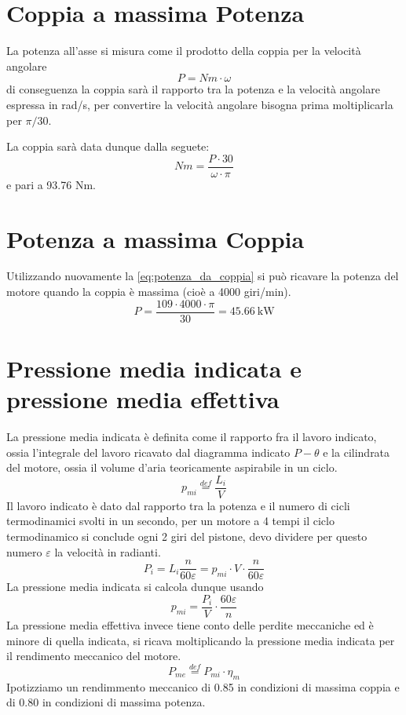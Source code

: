 \documentclass[a4paper,12pt]{article}
\begin{document}
\section{Coppia a massima Potenza}
\label{sec:coppia_a_massima_potenza}
La potenza all'asse si misura come il prodotto della coppia per la velocità angolare
\begin{equation}
    \label{eq:potenza_da_coppia}
    P = Nm \cdot \omega
\end{equation}
di conseguenza la coppia sarà il rapporto tra la potenza e la velocità angolare espressa in rad/s, per convertire la velocità angolare bisogna prima moltiplicarla
per $\pi/30$.

La coppia sarà data dunque dalla seguete:
\begin{equation}
    Nm = \frac{P\cdot 30 }{\omega\cdot \pi}
\end{equation}
e pari a 93.76 Nm.

\section{Potenza a massima Coppia}
Utilizzando nuovamente la \eqref{eq:potenza_da_coppia} si può ricavare la potenza del motore quando la coppia è massima (cioè a 4000 giri/min).
\begin{equation*}
    P = \frac{109\cdot4000\cdot\pi}{30} = 45.66\ \text{kW}
\end{equation*}

\section{Pressione media indicata e pressione media effettiva}
La pressione media indicata è definita come il rapporto fra il lavoro indicato, ossia l'integrale del lavoro ricavato dal diagramma indicato $P-\theta$ e la cilindrata
del motore, ossia il volume d'aria teoricamente aspirabile in un ciclo.
\begin{equation}
    p_{mi} \stackrel{def}{=} \frac{L_i}{V}
\end{equation}
Il lavoro indicato è dato dal rapporto tra la potenza e il numero di cicli termodinamici svolti in un secondo, per un motore a 4 tempi il ciclo termodinamico si conclude 
ogni 2 giri del pistone, devo dividere per questo numero $\varepsilon$ la velocità in radianti.
\begin{equation}
    P_i = L_i \frac{n}{60\varepsilon} = p_{mi} \cdot V \cdot \frac{n}{60\varepsilon}
\end{equation}
La pressione media indicata si calcola dunque usando
\begin{equation}
    \label{eq:pressione_media_indicata}
    p_{mi} = \frac{P_i}{V} \cdot  \frac{60\varepsilon}{n}
\end{equation}
La pressione media effettiva invece tiene conto delle perdite meccaniche ed è minore di quella indicata, si ricava moltiplicando la pressione media indicata
per il rendimento meccanico del motore.
\begin{equation}
    P_{me} \stackrel{def}{=} P_{mi}\cdot \eta_m
\end{equation}
Ipotizziamo un rendimmento meccanico di 0.85 in condizioni di massima coppia e di 0.80 in condizioni di massima potenza.
\end{document}
